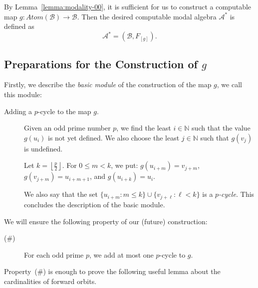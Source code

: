 \documentclass[a4paper,UKenglish,cleveref, autoref, thm-restate]{lipics-v2021}
\begin{document}
By Lemma~\ref{lemma:modality-00}, it is sufficient for us to construct a computable map 
$
	g\colon Atom(\mathcal{B}) \to \mathcal{B}.
$ 
Then the desired computable modal algebra $\mathcal{A}^{\ast}$ is defined as
\begin{equation}\label{equ:A-star}
	 \mathcal{A}^{\ast} = (\mathcal{B}, F_{[g]}).
\end{equation}

\subsection{Preparations for the Construction of $g$}

Firstly, we describe the \emph{basic module} of the construction of the map $g$, we call this module:

\begin{description}
\item[Adding a $p$-cycle to the map $g$.]
Given an odd prime number $p$, we find the least $i\in\mathbb{N}$ such that the value $g(u_i)$ is not yet defined. We also choose the least $j\in\mathbb{N}$ such that $g(v_j)$ is undefined. 

Let $k = \left\lfloor \frac{p}{2}\right\rfloor$. For $0\leq m< k$, we put: 
$g(u_{i+m}) = v_{j+m}$, 
$g(v_{j+m}) = u_{i+m+1}$, and
$g(u_{i+k}) = u_i$.

We also say that the set $\{ u_{i+m} : m\leq k\} \cup \{ v_{j + \ell} : \ell <k\}$ is a \emph{$p$-cycle.} This concludes the description of the basic module.
\end{description}






We will ensure the following property of our (future) construction: 
\begin{description}
	\item[(\#)] For each odd prime $p$, we add at most one $p$-cycle to $g$.
\end{description}

Property~(\#) is enough to prove the following useful lemma about the cardinalities of forward orbits. 
\end{document}
